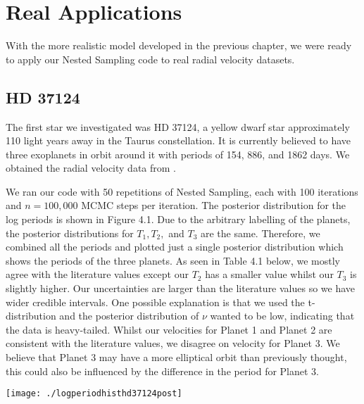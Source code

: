 \chapter{Real Applications} %
With the more realistic model developed in the previous chapter, we were ready to apply our Nested Sampling code to real radial velocity datasets.


\section{HD 37124}
The first star we investigated was HD 37124, a yellow dwarf star approximately 110 light years away in the Taurus constellation. It is currently believed to have three exoplanets in orbit around it with periods of 154, 886, and 1862 days. We obtained the radial velocity data from \cite{2011ApJ...730...93W}.


We ran our code with 50 repetitions of Nested Sampling, each with 100 iterations and $n = 100,000$ MCMC steps per iteration. The posterior distribution for the log periods is shown in Figure 4.1. Due to the arbitrary labelling of the planets, the posterior distributions for $T_1, T_2,$ and $T_3$ are the same. Therefore, we combined all the periods and plotted just a single posterior distribution which shows the periods of the three planets. As seen in Table 4.1 below, we mostly agree with the literature values except our $T_2$ has a smaller value whilst our $T_3$ is slightly higher. Our uncertainties are larger than the literature values so we have wider credible intervals. One possible explanation is that we used the t-distribution and the posterior distribution of $\nu$ wanted to be low, indicating that the data is heavy-tailed. Whilst our velocities for Planet 1 and Planet 2 are consistent with the literature values, we disagree on velocity for Planet 3. We believe that Planet 3 may have a more elliptical orbit than previously thought, this could also be influenced by the difference in the period for Planet 3.


\noindent
\begin{minipage}{\linewidth}%
\centering
\texttt{[image: ./logperiodhisthd37124post]}
\label{fig:LpPost}
\end{minipage}


